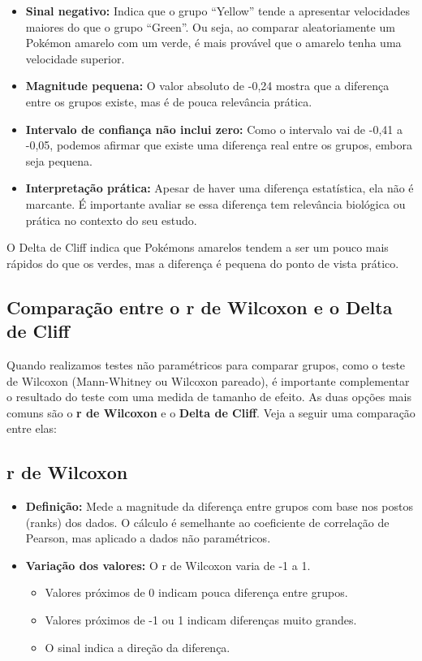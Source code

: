 \documentclass[
]{book}
\providecommand{\tightlist}{%
  \setlength{\itemsep}{0pt}\setlength{\parskip}{0pt}}
\begin{document}
\begin{itemize}
\tightlist
\item
  \textbf{Sinal negativo:} Indica que o grupo ``Yellow'' tende a apresentar velocidades maiores do que o grupo ``Green''. Ou seja, ao comparar aleatoriamente um Pokémon amarelo com um verde, é mais provável que o amarelo tenha uma velocidade superior.
\item
  \textbf{Magnitude pequena:} O valor absoluto de -0,24 mostra que a diferença entre os grupos existe, mas é de pouca relevância prática.
\item
  \textbf{Intervalo de confiança não inclui zero:} Como o intervalo vai de -0,41 a -0,05, podemos afirmar que existe uma diferença real entre os grupos, embora seja pequena.
\item
  \textbf{Interpretação prática:} Apesar de haver uma diferença estatística, ela não é marcante. É importante avaliar se essa diferença tem relevância biológica ou prática no contexto do seu estudo.
\end{itemize}

O Delta de Cliff indica que Pokémons amarelos tendem a ser um pouco mais rápidos do que os verdes, mas a diferença é pequena do ponto de vista prático.

\subsection{Comparação entre o r de Wilcoxon e o Delta de Cliff}\label{comparauxe7uxe3o-entre-o-r-de-wilcoxon-e-o-delta-de-cliff}

Quando realizamos testes não paramétricos para comparar grupos, como o teste de Wilcoxon (Mann-Whitney ou Wilcoxon pareado), é importante complementar o resultado do teste com uma medida de tamanho de efeito. As duas opções mais comuns são o \textbf{r de Wilcoxon} e o \textbf{Delta de Cliff}. Veja a seguir uma comparação entre elas:

\subsection{r de Wilcoxon}\label{r-de-wilcoxon}

\begin{itemize}
\tightlist
\item
  \textbf{Definição:} Mede a magnitude da diferença entre grupos com base nos postos (ranks) dos dados. O cálculo é semelhante ao coeficiente de correlação de Pearson, mas aplicado a dados não paramétricos.
\item
  \textbf{Variação dos valores:} O r de Wilcoxon varia de -1 a 1.

  \begin{itemize}
  \tightlist
  \item
    Valores próximos de 0 indicam pouca diferença entre grupos.
  \item
    Valores próximos de -1 ou 1 indicam diferenças muito grandes.
  \item
    O sinal indica a direção da diferença.
  \end{itemize}
\end{itemize}
\end{document}
